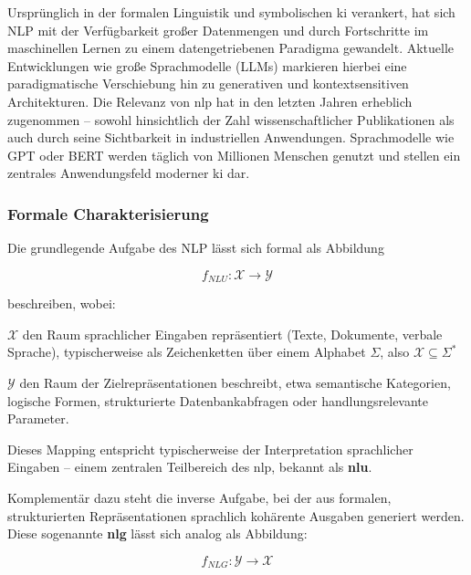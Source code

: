 Ursprünglich in der formalen Linguistik und symbolischen \ac{ki} verankert, hat sich NLP mit der Verfügbarkeit großer Datenmengen und durch Fortschritte im maschinellen Lernen zu einem datengetriebenen Paradigma gewandelt. Aktuelle Entwicklungen wie große Sprachmodelle (LLMs) markieren hierbei eine paradigmatische Verschiebung hin zu generativen und kontextsensitiven Architekturen.
Die Relevanz von \ac{nlp} hat in den letzten Jahren erheblich zugenommen – sowohl hinsichtlich der Zahl wissenschaftlicher Publikationen als auch durch seine Sichtbarkeit in industriellen Anwendungen. Sprachmodelle wie GPT oder BERT werden täglich von Millionen Menschen genutzt und stellen ein zentrales Anwendungsfeld moderner \ac{ki} dar.

\subsubsection{Formale Charakterisierung}
Die grundlegende Aufgabe des NLP lässt sich formal als Abbildung

    \vspace{-1em}
    \[f_{NLU} : \mathcal{X} \rightarrow \mathcal{Y} \]
    \vspace{-1em}

beschreiben, wobei:

\begin{adjustwidth}{1cm}{0cm}
    \( \mathcal{X} \) den Raum sprachlicher Eingaben repräsentiert (Texte, Dokumente, verbale Sprache), typischerweise als Zeichenketten über einem Alphabet  \( \Sigma\), also  \( \mathcal{X} \subseteq \Sigma ^* \) 
    
    \( \mathcal{Y} \) den Raum der Zielrepräsentationen beschreibt, etwa semantische Kategorien, logische Formen, strukturierte Datenbankabfragen oder handlungsrelevante Parameter.
\end{adjustwidth}

Dieses Mapping entspricht typischerweise der Interpretation sprachlicher Eingaben – einem zentralen Teilbereich des \ac{nlp}, bekannt als \textbf{\ac{nlu}}.

Komplementär dazu steht die inverse Aufgabe, bei der aus formalen, strukturierten Repräsentationen sprachlich kohärente Ausgaben generiert werden. Diese sogenannte \textbf{\ac{nlg}} lässt sich analog als Abbildung:

    \vspace{-1em}
    \[f_{NLG} :  \mathcal{Y} \rightarrow \mathcal{X} \]
    \vspace{-1em}


